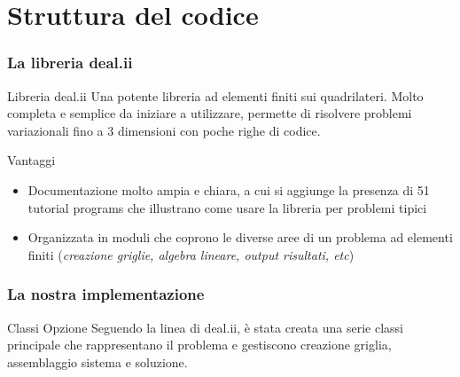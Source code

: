 \documentclass{beamer}
\begin{document}




\section{Struttura del codice}

\begin{frame}
\frametitle{La libreria \textsf{deal.ii}}
\begin{block}{Libreria \textsf{deal.ii}}
Una potente libreria ad elementi finiti sui quadrilateri. Molto completa e semplice da iniziare a utilizzare, permette di risolvere problemi variazionali fino a 3 dimensioni con poche righe di codice. 
\end{block}

\pause
\begin{block}{Vantaggi}
 \begin{itemize}
  \item Documentazione molto ampia e chiara, a cui si aggiunge la presenza di 51 tutorial programs che illustrano come usare la libreria per problemi tipici
  \item Organizzata in moduli che coprono le diverse aree di un problema ad elementi finiti (\emph{creazione griglie, algebra lineare, output risultati, etc})
 \end{itemize}
\end{block}
\end{frame}

\begin{frame}
 \frametitle{La nostra implementazione }
 \begin{block}{Classi Opzione}
 Seguendo la linea di \textsf{deal.ii}, è stata creata una serie classi principale che rappresentano il problema e gestiscono creazione griglia, assemblaggio sistema e soluzione.
 \end{block}
\end{frame}


\end{document}
